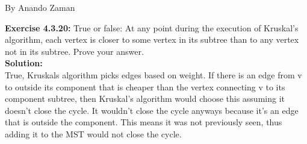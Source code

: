 \documentclass[11pt,fleqn]{article}
\begin{document}
By Anando Zaman


\textbf{Exercise 4.3.20:} True or false: At any point during the execution of Kruskal’s algorithm, each
vertex is closer to some vertex in its subtree than to any vertex not in its subtree. Prove
your answer.\\

\textbf{Solution:}\\
True, Kruskals algorithm picks edges based on weight. If there is an edge from v to outside its component that is cheaper than the vertex connecting v to its component subtree, then Kruskal's algorithm would choose this assuming it doesn't close the cycle. It wouldn't close the cycle anyways because it's an edge that is outside the component. This means it was not previously seen, thus adding it to the MST would not close the cycle.
\end{document}
